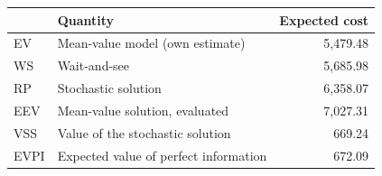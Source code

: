\begin{tabular}{llr}
\toprule
 & Quantity & Expected cost \\
\midrule
EV & Mean-value model (own estimate) & 5,479.48 \\
WS & Wait-and-see & 5,685.98 \\
RP & Stochastic solution & 6,358.07 \\
EEV & Mean-value solution, evaluated & 7,027.31 \\
VSS & Value of the stochastic solution & 669.24 \\
EVPI & Expected value of perfect information & 672.09 \\
\bottomrule
\end{tabular}

